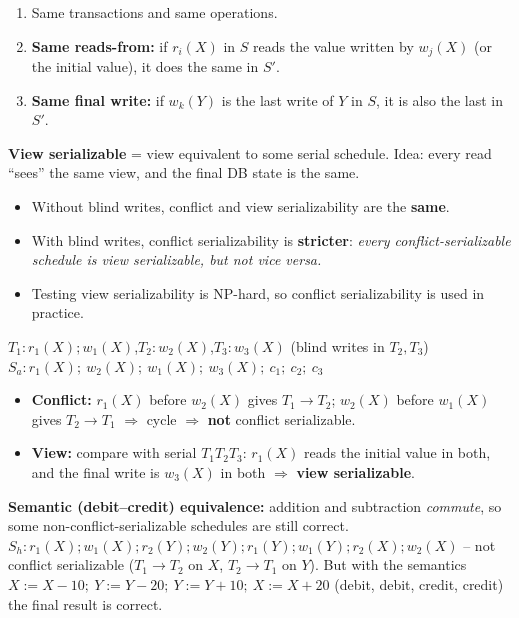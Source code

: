 \documentclass[10pt,a4paper]{article}
\newcommand{\ri}[2]{r_{#1}(#2)}
\newcommand{\wi}[2]{w_{#1}(#2)}
\begin{document}
\begin{keybox}
\begin{enumerate}
  \item Same transactions and same operations.
  \item \textbf{Same reads-from:} if $r_i(X)$ in $S$ reads the value written by $w_j(X)$ (or the initial value), it does the same in $S'$.
  \item \textbf{Same final write:} if $w_k(Y)$ is the last write of $Y$ in $S$, it is also the last in $S'$.
\end{enumerate}
\textbf{View serializable} = view equivalent to some serial schedule. Idea: every read ``sees'' the same view, and the final DB state is the same.
\end{keybox}

\begin{itemize}
  \item Without blind writes, conflict and view serializability are the \textbf{same}.
  \item With blind writes, conflict serializability is \textbf{stricter}: \emph{every conflict-serializable schedule is view serializable, but not vice versa.}
  \item Testing view serializability is NP-hard, so conflict serializability is used in practice.
\end{itemize}

\begin{exbox}
$T_1: r_1(X); w_1(X)$,\quad $T_2: w_2(X)$,\quad $T_3: w_3(X)$ \;(blind writes in $T_2,T_3$)\\
$S_a: \ri1X;\ \wi2X;\ \wi1X;\ \wi3X;\ c_1;\ c_2;\ c_3$
\begin{itemize}
  \item \textbf{Conflict:} $\ri1X$ before $\wi2X$ gives $T_1\to T_2$; $\wi2X$ before $\wi1X$ gives $T_2\to T_1$ $\Rightarrow$ cycle $\Rightarrow$ \textbf{not} conflict serializable.
  \item \textbf{View:} compare with serial $T_1T_2T_3$: $r_1(X)$ reads the initial value in both, and the final write is $w_3(X)$ in both $\Rightarrow$ \textbf{view serializable}.
\end{itemize}
\end{exbox}

\textbf{Semantic (debit--credit) equivalence:} addition and subtraction \emph{commute}, so some non-conflict-serializable schedules are still correct.\\
$S_h: \ri1X; \wi1X; \ri2Y; \wi2Y; \ri1Y; \wi1Y; \ri2X; \wi2X$ -- not conflict serializable ($T_1\to T_2$ on $X$, $T_2\to T_1$ on $Y$). But with the semantics
$X{:=}X{-}10;\ Y{:=}Y{-}20;\ Y{:=}Y{+}10;\ X{:=}X{+}20$ (debit, debit, credit, credit) the final result is correct.
\end{document}
